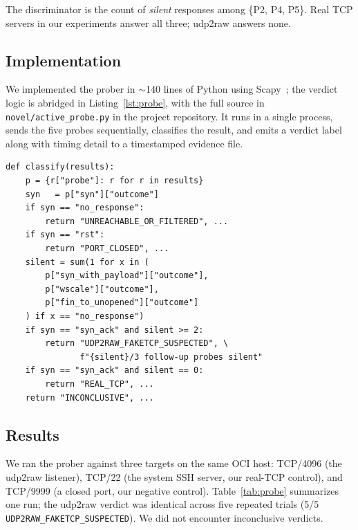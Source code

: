 \documentclass[conference]{IEEEtran}
\begin{document}
The discriminator is the count of \emph{silent} responses among
\{P2, P4, P5\}. Real TCP servers in our experiments answer all three;
udp2raw answers none.

\subsection{Implementation}

We implemented the prober in $\sim$140 lines of Python using
Scapy~\cite{scapy}; the verdict logic is abridged in
Listing~\ref{lst:probe}, with the full source in
\texttt{novel/active\_probe.py} in the project repository. It runs in
a single process, sends the five probes sequentially, classifies the
result, and emits a verdict label along with timing detail to a
timestamped evidence file.

\begin{codelisting}[t]
\caption{Active prober verdict logic, abridged.}
\label{lst:probe}
\begin{lstlisting}
def classify(results):
    p = {r["probe"]: r for r in results}
    syn   = p["syn"]["outcome"]
    if syn == "no_response":
        return "UNREACHABLE_OR_FILTERED", ...
    if syn == "rst":
        return "PORT_CLOSED", ...
    silent = sum(1 for x in (
        p["syn_with_payload"]["outcome"],
        p["wscale"]["outcome"],
        p["fin_to_unopened"]["outcome"]
    ) if x == "no_response")
    if syn == "syn_ack" and silent >= 2:
        return "UDP2RAW_FAKETCP_SUSPECTED", \
               f"{silent}/3 follow-up probes silent"
    if syn == "syn_ack" and silent == 0:
        return "REAL_TCP", ...
    return "INCONCLUSIVE", ...
\end{lstlisting}
\end{codelisting}

\subsection{Results}

We ran the prober against three targets on the same OCI host:
TCP/4096 (the udp2raw listener), TCP/22 (the system SSH server, our
real-TCP control), and TCP/9999 (a closed port, our negative control).
Table~\ref{tab:probe} summarizes one run; the udp2raw verdict was
identical across five repeated trials (5/5 \texttt{UDP2RAW\_FAKETCP\_SUSPECTED}).
We did not encounter inconclusive verdicts.
\end{document}
